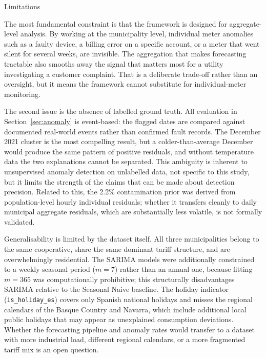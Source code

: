 ﻿\documentclass[12pt,reqno, twoside]{amsbook}
\makeatletter
\numberwithin{figure}{chapter}
\numberwithin{table}{chapter}
\numberwithin{equation}{chapter}
\def\section{\@startsection{section}{1}%
      \z@{.5\linespacing\@plus.7\linespacing}{.25\linespacing}%
      {\normalfont\bfseries\flushleft}}
\theoremstyle{plain}
\numberwithin{equation}{chapter}
\numberwithin{section}{chapter}
\makeatother
\begin{document}
\section{Limitations}

The most fundamental constraint is that the framework is designed for aggregate-level analysis. By working at the municipality level, individual meter anomalies such as a faulty device, a billing error on a specific account, or a meter that went silent for several weeks, are invisible. The aggregation that makes forecasting tractable also smooths away the signal that matters most for a utility investigating a customer complaint. That is a deliberate trade-off rather than an oversight, but it means the framework cannot substitute for individual-meter monitoring.

The second issue is the absence of labelled ground truth. All evaluation in Section~\ref{sec:anomaly} is event-based: the flagged dates are compared against documented real-world events rather than confirmed fault records. The December 2021 cluster is the most compelling result, but a colder-than-average December would produce the same pattern of positive residuals, and without temperature data the two explanations cannot be separated. This ambiguity is inherent to unsupervised anomaly detection on unlabelled data, not specific to this study, but it limits the strength of the claims that can be made about detection precision. Related to this, the 2.2\% contamination prior was derived from population-level hourly individual residuals; whether it transfers cleanly to daily municipal aggregate residuals, which are substantially less volatile, is not formally validated.

Generalisability is limited by the dataset itself. All three municipalities belong to the same cooperative, share the same dominant tariff structure, and are overwhelmingly residential. The \ac{SARIMA} models were additionally constrained to a weekly seasonal period ($m=7$) rather than an annual one, because fitting $m=365$ was computationally prohibitive; this structurally disadvantages \ac{SARIMA} relative to the Seasonal Naive baseline. The holiday indicator (\texttt{is\_holiday\_es}) covers only Spanish national holidays and misses the regional calendars of the Basque Country and Navarra, which include additional local public holidays that may appear as unexplained consumption deviations. Whether the forecasting pipeline and anomaly rates would transfer to a dataset with more industrial load, different regional calendars, or a more fragmented tariff mix is an open question.
\end{document}

